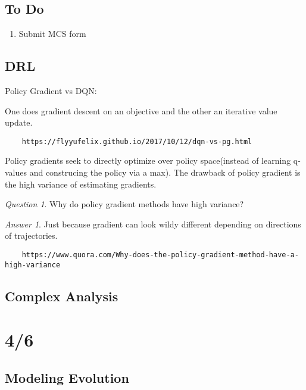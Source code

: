 \documentclass[11pt]{article}
\theoremstyle{remark}
\newtheorem{quest}{Question}
\newtheorem{ans}{Answer}
\begin{document}
\subsection{To Do}

\begin{enumerate}
	\item Submit MCS form
\end{enumerate}

\subsection{DRL}

Policy Gradient vs DQN:

One does gradient descent on an objective and the other an iterative value update.

\begin{verbatim}
	https://flyyufelix.github.io/2017/10/12/dqn-vs-pg.html
\end{verbatim}

Policy gradients seek to directly optimize over policy space(instead of learning q-values and construcing the policy via a max). The drawback of policy gradient is the high variance of estimating gradients. 

\begin{quest}
	Why do policy gradient methods have high variance?
\end{quest}

\begin{ans}
	Just because gradient can look wildy different depending on directions of trajectories.
\end{ans}

\begin{verbatim}
	https://www.quora.com/Why-does-the-policy-gradient-method-have-a-high-variance
\end{verbatim}

\subsection{Complex Analysis}

\section{4/6}

\subsection{Modeling Evolution}
\end{document}
